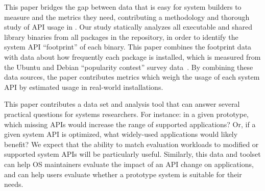 This paper bridges the gap between 
data that is easy for system builders to measure and the 
metrics they need, contributing 
 a methodology and thorough study of API usage in \osarch{} \osdist{}.
Our study statically analyzes all executable and shared library binaries from all
\packagenum{} packages in the \osdist{} repository, in order
to identify the system API ``footprint'' of each binary.
This paper combines the footprint data with data about how frequently 
each package is installed, which is measured from the Ubuntu and Debian ``popularity contest'' survey data~\cite{ubuntu-popularity, debian-popularity}.
By combining these data sources, the paper contributes metrics
which weigh the usage of each system API by estimated usage in real-world installations.





This paper contributes a data set and analysis tool
that can answer several practical questions for systems researchers.
For instance: in a given prototype, which missing APIs would increase the range of supported applications?
Or, if a given system API is optimized, what widely-used applications
would likely benefit?  We expect that the ability to match evaluation workloads to modified or supported system APIs
will be particularly useful.  
Similarly, this data and toolset can help 
OS maintainers evaluate the impact of an API change on applications, and can help users
evaluate whether a prototype system is suitable for their needs.

